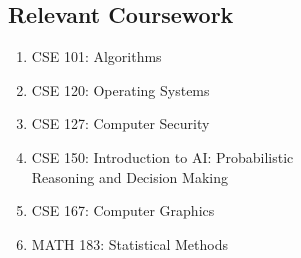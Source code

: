 \documentclass{article}
\begin{document}
\begin{paracol}{2}
\section{Relevant Coursework}
\begin{enumerate}[leftmargin=0cm]
	\item[] CSE 101: Algorithms
	\item[] CSE 120: Operating Systems
	\item[] CSE 127: Computer Security
	\item[] CSE 150: Introduction to AI: Probabilistic\\Reasoning and Decision Making 
	\item[] CSE 167: Computer Graphics
	\item[] MATH 183: Statistical Methods
\end{enumerate}

\end{paracol}
\end{document}
